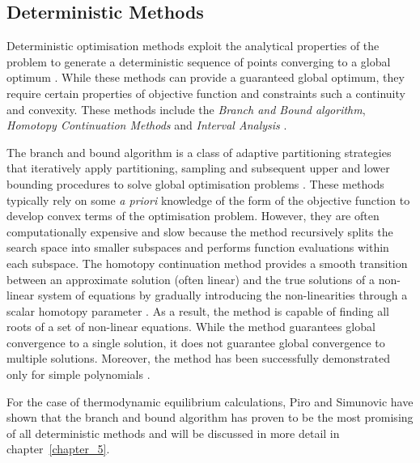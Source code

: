 	\subsection{Deterministic Methods}
	Deterministic optimisation methods exploit the analytical properties of the problem to generate a deterministic sequence of points converging to a global optimum \cite{PARDALOS2000209}. While these methods can provide a guaranteed global optimum, they require certain properties of objective function and constraints such a continuity and convexity. These methods include the \emph{Branch and Bound algorithm}, \emph{Homotopy Continuation Methods}  and \emph{Interval Analysis} \cite{Floudas99}.

	The branch and bound algorithm is a class of adaptive partitioning strategies that iteratively apply partitioning, sampling and subsequent upper and lower bounding procedures to solve global optimisation problems \cite{Floudas99}.  These methods typically rely on some \textit{a priori} knowledge of the form of the objective function to  develop convex terms of the optimisation problem. However, they are often computationally expensive and slow \cite{Wakeham04,Nichita02} because the method recursively splits the search space into smaller subspaces and performs function evaluations within each subspace. The homotopy continuation method provides a smooth transition between an approximate solution (often linear) and the true solutions of a non-linear system of equations by gradually introducing the non-linearities through a scalar homotopy parameter \cite{B.-Riggs:1994aa,JALALI20082333}. As a result, the method is capable of finding all roots of a set of non-linear equations. While the method guarantees global convergence to a single solution, it does not guarantee global convergence to multiple solutions. Moreover, the method has been successfully demonstrated only for simple polynomials \cite{Zhang11}.

	For the case of thermodynamic equilibrium calculations, Piro and Simunovic \cite{Piro16} have shown that the branch and bound algorithm has proven to be the most promising of all deterministic methods and will be discussed in more detail in chapter~\ref{chapter_5}.


